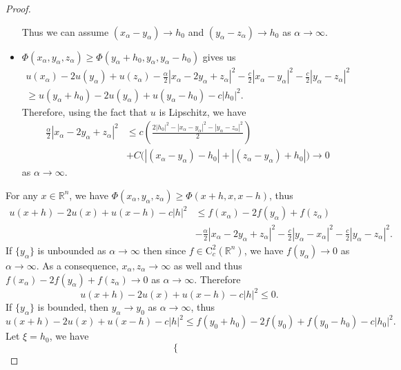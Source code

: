 \documentclass[12pt,reqno]{amsart}
\numberwithin{figure}{section}
\theoremstyle{plain}
\theoremstyle{remark}
\numberwithin{equation}{section}
\newcommand{\R}{\mathbb{R}}
\begin{document}
\begin{proof}
\begin{itemize}
    Thus we can assume $(x_\alpha-y_\alpha)\to h_0$ and $(y_\alpha-z_\alpha)\to h_0$ as $\alpha\to \infty$.
    \item $\Phi(x_\alpha,y_\alpha,z_\alpha )\geq \Phi(y_\alpha+h_0,y_\alpha,y_\alpha-h_0)$ gives us
    \begin{align*}
        u(x_\alpha)-2u(y_\alpha) + u(z_\alpha) - \frac{\alpha}{2}|x_\alpha - 2y_\alpha+z_\alpha|^2 - \frac{c}{2}|x_\alpha-y_\alpha|^2 - \frac{c}{2}|y_\alpha-z_\alpha|^2 \\
        \geq u(y_\alpha+h_0) - 2u(y_\alpha) + u(y_\alpha-h_0) - c|h_0|^2.
    \end{align*}
    Therefore, using the fact that $u$ is Lipschitz, we have
    \begin{equation*}
    \begin{split}
        \frac{\alpha}{2}|x_\alpha - 2y_\alpha+z_\alpha|^2 
        &\leq c\left(\frac{2|h_0|^2 - |x_\alpha-y_\alpha|^2 - |y_\alpha-z_\alpha|^2}{2}\right) \\
        &+ C\Big(|(x_\alpha-y_\alpha) - h_0| + |(z_\alpha - y_\alpha) + h_0|\Big) \to 0
    \end{split}
    \end{equation*}
    as $\alpha\to \infty$.
\end{itemize}
For any $x\in \R^n$, we have $\Phi(x_\alpha,y_\alpha,z_\alpha) \geq \Phi(x+h,x,x-h)$, thus
\begin{align*}
    u(x+h)-2u(x)+u(x-h)-c|h|^2 &\leq f(x_\alpha)-2f(y_\alpha) + f(z_\alpha) \\
    &- \frac{\alpha}{2}|x_\alpha - 2y_\alpha+z_\alpha|^2-\frac{c}{2}|y_\alpha-x_\alpha|^2-\frac{c}{2}|y_\alpha-z_\alpha|^2.
\end{align*}
If $\{y_\alpha\}$ is unbounded as $\alpha\to \infty$ then since $f\in \mathrm{C}_c^2(\R^n)$, we have $f(y_\alpha)\to 0$ as $\alpha\to \infty$. As a consequence, $x_\alpha,z_\alpha \to \infty$ as well and thus $f(x_\alpha)-2f(y_\alpha) + f(z_\alpha)\to 0$ as $\alpha\to \infty$. Therefore
\begin{equation*}
    u(x+h)-2u(x)+u(x-h)-c|h|^2 \leq 0.
\end{equation*}
If $\{y_\alpha\}$ is bounded, then $y_\alpha\to y_0$ as $\alpha\to \infty$, thus
\begin{equation*}
     u(x+h)-2u(x)+u(x-h)-c|h|^2 \leq f(y_0+h_0) - 2f(y_0) + f(y_0-h_0) -c|h_0|^2.
\end{equation*}
Let $\xi = h_0$, we have
\begin{equation*}
    \begin{cases}

\end{cases}
\end{equation*}
\end{proof}
\end{document}
